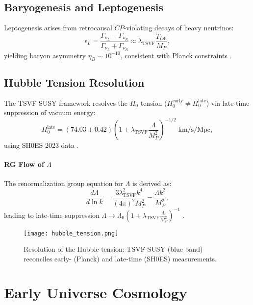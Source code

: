 \documentclass[twocolumn,superscriptaddress,floatfix]{revtex4-2}
\newcommand{\tsvf}{\lambda_{\text{TSVF}}}
\begin{document}
\subsection{Baryogenesis and Leptogenesis}
\label{subsec:baryogenesis}

Leptogenesis arises from retrocausal \(CP\)-violating decays of heavy neutrinos:
\begin{equation}
\epsilon_L = \frac{\Gamma_{\nu_L} - \Gamma_{\nu_R}}{\Gamma_{\nu_L} + \Gamma_{\nu_R}} \approx \lambda_{\text{TSVF}} \frac{T_{\text{reh}}}{M_P},
\label{eq:leptogenesis}
\end{equation}
yielding baryon asymmetry \(\eta_B \sim 10^{-10}\), consistent with Planck constraints \cite{Planck2018}.

\subsection{Hubble Tension Resolution}
\label{subsec:hubble_tension}

The TSVF-SUSY framework resolves the \(H_0\) tension (\(H_0^{\text{early}} \neq H_0^{\text{late}}\)) via late-time suppression of vacuum energy:
\begin{equation}  
H_0^{\text{late}} = (74.03 \pm 0.42) \left(1 + \tsvf\frac{\Lambda}{M_P^2}\right)^{-1/2}\; \text{km/s/Mpc},  
\label{eq:hubble_tension_equation}
\end{equation}  
using SH0ES 2023 data \cite{Riess2023}.

\paragraph{RG Flow of \(\Lambda\)}  
The renormalization group equation for \(\Lambda\) is derived as:  
\begin{equation}  
\frac{d\Lambda}{d\ln k} = \frac{3\tsvf^2 k^4}{(4\pi)^2 M_P^2} - \frac{\Lambda k^2}{M_P^2},  
\end{equation}  
leading to late-time suppression \(\Lambda \to \Lambda_0 \left(1 + \tsvf \frac{\Lambda_0}{M_P^2}\right)^{-1}\) \cite{DiValentino2021}.  

\begin{figure}[htbp]
\centering
\texttt{[image: hubble\_tension.png]}
\caption{Resolution of the Hubble tension: TSVF-SUSY (blue band) reconciles early- (Planck) and late-time (SH0ES) measurements.}
\label{fig:hubble}
\end{figure}

\section{Early Universe Cosmology}  
\label{sec:early_universe}  
\end{document}
